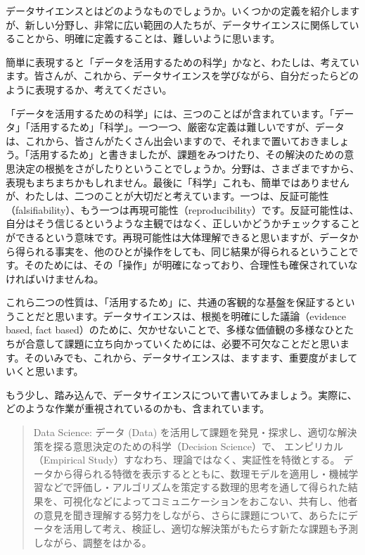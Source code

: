 \documentclass[
  xelatex, ja=standard]{bxjsbook}
\theoremstyle{definition}
\theoremstyle{definition}
\theoremstyle{definition}
\theoremstyle{definition}
\theoremstyle{remark}
\begin{document}
データサイエンスとはどのようなものでしょうか。いくつかの定義を紹介しますが、新しい分野し、非常に広い範囲の人たちが、データサイエンスに関係していることから、明確に定義することは、難しいように思います。

簡単に表現すると「データを活用するための科学」かなと、わたしは、考えています。皆さんが、これから、データサイエンスを学びながら、自分だったらどのように表現するか、考えてください。

「データを活用するための科学」には、三つのことばが含まれています。「データ」「活用するため」「科学」。一つ一つ、厳密な定義は難しいですが、データは、これから、皆さんがたくさん出会いますので、それまで置いておきましょう。「活用するため」と書きましたが、課題をみつけたり、その解決のための意思決定の根拠をさがしたりということでしょうか。分野は、さまざまですから、表現もまちまちかもしれません。最後に「科学」これも、簡単ではありませんが、わたしは、二つのことが大切だと考えています。一つは、反証可能性（falsifiability）、もう一つは再現可能性（reproducibility）です。反証可能性は、自分はそう信じるというような主観ではなく、正しいかどうかチェックすることができるという意味です。再現可能性は大体理解できると思いますが、データから得られる事実を、他のひとが操作をしても、同じ結果が得られるということです。そのためには、その「操作」が明確になっており、合理性も確保されていなければいけませんね。

これら二つの性質は、「活用するため」に、共通の客観的な基盤を保証するということだと思います。データサイエンスは、根拠を明確にした議論（evidence based, fact based）のために、欠かせないことで、多様な価値観の多様なひとたちが合意して課題に立ち向かっていくためには、必要不可欠なことだと思います。そのいみでも、これから、データサイエンスは、ますます、重要度がましていくと思います。

もう少し、踏み込んで、データサイエンスについて書いてみましょう。実際に、どのような作業が重視されているのかも、含まれています。

\begin{quote}
Data Science: データ (Data) を活用して課題を発見・探求し、適切な解決策を探る意思決定のための科学（Decision Science）で、 エンピリカル（Empirical Study）すなわち、理論ではなく、実証性を特徴とする。 データから得られる特徴を表示するとともに、数理モデルを適用し・機械学習などで評価し・アルゴリズムを策定する数理的思考を通して得られた結果を、可視化などによってコミュニケーションをおこない、共有し、他者の意見を聞き理解する努力をしながら、さらに課題について、あらたにデータを活用して考え、検証し、適切な解決策がもたらす新たな課題も予測しながら、調整をはかる。
\end{quote}
\end{document}
